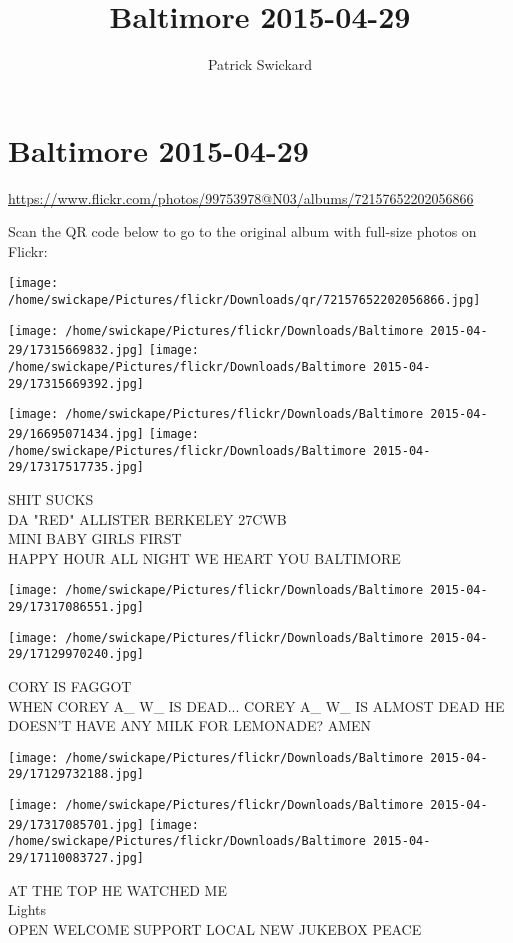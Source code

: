 \documentclass[10pt,letterpaper]{article}
\title{Baltimore 2015-04-29}
\author{Patrick Swickard}
\date{}
\begin{document}
\section*{Baltimore 2015-04-29}

\url{https://www.flickr.com/photos/99753978@N03/albums/72157652202056866}

Scan the QR code below to go to the original album with full-size photos on Flickr:

\texttt{[image: /home/swickape/Pictures/flickr/Downloads/qr/72157652202056866.jpg]}
\pagebreak

\texttt{[image: /home/swickape/Pictures/flickr/Downloads/Baltimore 2015-04-29/17315669832.jpg]}
\texttt{[image: /home/swickape/Pictures/flickr/Downloads/Baltimore 2015-04-29/17315669392.jpg]}

\texttt{[image: /home/swickape/Pictures/flickr/Downloads/Baltimore 2015-04-29/16695071434.jpg]}
\texttt{[image: /home/swickape/Pictures/flickr/Downloads/Baltimore 2015-04-29/17317517735.jpg]}

SHIT SUCKS\\
DA "RED" ALLISTER BERKELEY 27CWB\\
MINI BABY GIRLS FIRST\\
HAPPY HOUR ALL NIGHT WE HEART YOU BALTIMORE
\pagebreak

\texttt{[image: /home/swickape/Pictures/flickr/Downloads/Baltimore 2015-04-29/17317086551.jpg]}

\vspace{0.25in}
\texttt{[image: /home/swickape/Pictures/flickr/Downloads/Baltimore 2015-04-29/17129970240.jpg]}

CORY IS FAGGOT\\
WHEN COREY A\_ W\_ IS DEAD...  COREY A\_ W\_ IS ALMOST DEAD HE DOESN'T HAVE ANY MILK FOR LEMONADE?  AMEN
\pagebreak

\texttt{[image: /home/swickape/Pictures/flickr/Downloads/Baltimore 2015-04-29/17129732188.jpg]}

\vspace{0.25in}
\texttt{[image: /home/swickape/Pictures/flickr/Downloads/Baltimore 2015-04-29/17317085701.jpg]}
\texttt{[image: /home/swickape/Pictures/flickr/Downloads/Baltimore 2015-04-29/17110083727.jpg]}

AT THE TOP HE WATCHED ME\\
Lights\\
OPEN WELCOME SUPPORT LOCAL NEW JUKEBOX PEACE
\pagebreak
\end{document}
